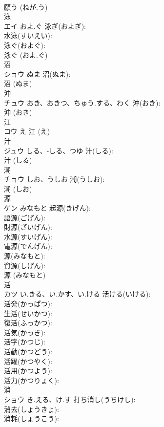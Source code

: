 \documentclass[8pt]{extreport}
\begin{document}
\begin{CJK}{UTF8}{min}
\\	願う (ねが.う)
\\	泳			
\\	エイ	およ.ぐ	泳ぎ(およぎ): 
\\	水泳(すいえい): 
\\	泳ぐ(およぐ): 
\\	泳ぐ (およ.ぐ)
\\	沼			
\\	ショウ	ぬま	沼(ぬま): 
\\	沼 (ぬま)
\\	沖			
\\	チュウ	おき、おきつ、ちゅう.する、わく	沖(おき): 
\\	沖 (おき)
\\	江			
\\	コウ	え		江 (え)
\\	汁			
\\	ジュウ	しる、-しる、つゆ	汁(しる): 
\\	汁 (しる)
\\	潮			
\\	チョウ	しお、うしお	潮(うしお): 
\\	潮 (しお)
\\	源			
\\	ゲン	みなもと	起源(きげん): 
\\	語源(ごげん): 
\\	財源(ざいげん): 
\\	水源(すいげん): 
\\	電源(でんげん): 
\\	源(みなもと): 
\\	資源(しげん): 
\\	源 (みなもと)
\\	活			
\\	カツ	い.きる、い.かす、い.ける	活ける(いける): 
\\	活発(かっぱつ): 
\\	生活(せいかつ): 
\\	復活(ふっかつ): 
\\	活気(かっき): 
\\	活字(かつじ): 
\\	活動(かつどう): 
\\	活躍(かつやく): 
\\	活用(かつよう): 
\\	活力(かつりょく): 
\\	消			
\\	ショウ	き.える、け.す	打ち消し(うちけし): 
\\	消去(しょうきょ): 
\\	消耗(しょうこう): 

\end{CJK}
\end{document}
